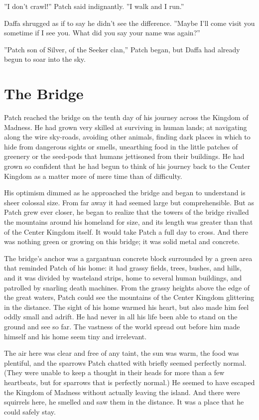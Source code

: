 \documentclass[12pt]{book}
\begin{document}
''I don't crawl!'' Patch said indignantly. ''I walk and I run.''

Daffa shrugged as if to say he didn't see the difference. ''Maybe I'll
come visit you sometime if I see you. What did you say your name was
again?''

''Patch son of Silver, of the Seeker clan,'' Patch began, but Daffa
had already begun to soar into the sky.


\section{The Bridge}

Patch reached the bridge on the tenth day of his journey across the
Kingdom of Madness. He had grown very skilled at surviving in human
lands; at navigating along the wire sky-roads, avoiding other animals,
finding dark places in which to hide from dangerous sights or smells,
unearthing food in the little patches of greenery or the seed-pods
that humans jettisoned from their buildings. He had grown so confident
that he had begun to think of his journey back to the Center Kingdom
as a matter more of mere time than of difficulty.

His optimism dimmed as he approached the bridge and began to
understand is sheer colossal size. From far away it had seemed large
but comprehensible. But as Patch grew ever closer, he began to realize
that the towers of the bridge rivalled the mountains around his
homeland for size, and its length was greater than that of the Center
Kingdom itself. It would take Patch a full day to cross. And there was
nothing green or growing on this bridge; it was solid metal and
concrete.

The bridge's anchor was a gargantuan concrete block surrounded by a
green area that reminded Patch of his home: it had grassy fields,
trees, bushes, and hills, and it was divided by wasteland strips, home
to several human buildings, and patrolled by snarling death
machines. From the grassy heights above the edge of the great waters,
Patch could see the mountains of the Center Kingdom glittering in the
distance. The sight of his home warmed his heart, but also made him
feel oddly small and adrift. He had never in all his life been able to
stand on the ground and see so far. The vastness of the world spread
out before him made himself and his home seem tiny and irrelevant.

The air here was clear and free of any taint, the sun was warm, the
food was plentiful, and the sparrows Patch chatted with briefly seemed
perfectly normal. (They were unable to keep a thought in their heads
for more than a few heartbeats, but for sparrows that is perfectly
normal.) He seemed to have escaped the Kingdom of Madness without
actually leaving the island. And there were squirrels here, he smelled
and saw them in the distance. It was a place that he could safely
stay.
\end{document}
